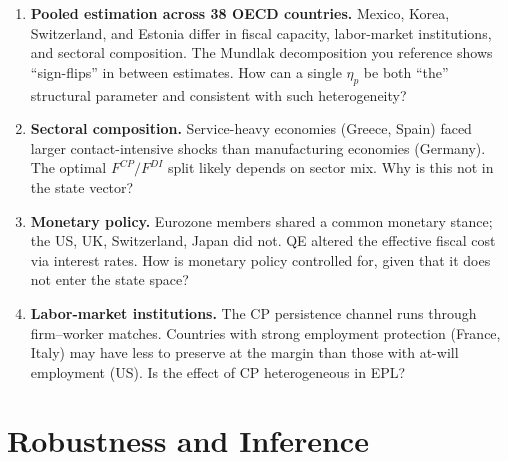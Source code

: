 \documentclass[11pt,a4paper]{article}
\begin{document}
\begin{enumerate}
\item \textbf{Pooled estimation across 38 OECD countries.} Mexico, Korea, Switzerland, and Estonia differ in fiscal capacity, labor-market institutions, and sectoral composition. The Mundlak decomposition you reference shows ``sign-flips'' in between estimates. How can a single $\hat\eta_p$ be both ``the'' structural parameter and consistent with such heterogeneity?

\item \textbf{Sectoral composition.} Service-heavy economies (Greece, Spain) faced larger contact-intensive shocks than manufacturing economies (Germany). The optimal $F^{CP}/F^{DI}$ split likely depends on sector mix. Why is this not in the state vector?

\item \textbf{Monetary policy.} Eurozone members shared a common monetary stance; the US, UK, Switzerland, Japan did not. QE altered the effective fiscal cost via interest rates. How is monetary policy controlled for, given that it does not enter the state space?

\item \textbf{Labor-market institutions.} The CP persistence channel runs through firm--worker matches. Countries with strong employment protection (France, Italy) may have less to preserve at the margin than those with at-will employment (US). Is the effect of CP heterogeneous in EPL?
\end{enumerate}

\section{Robustness and Inference}
\end{document}

